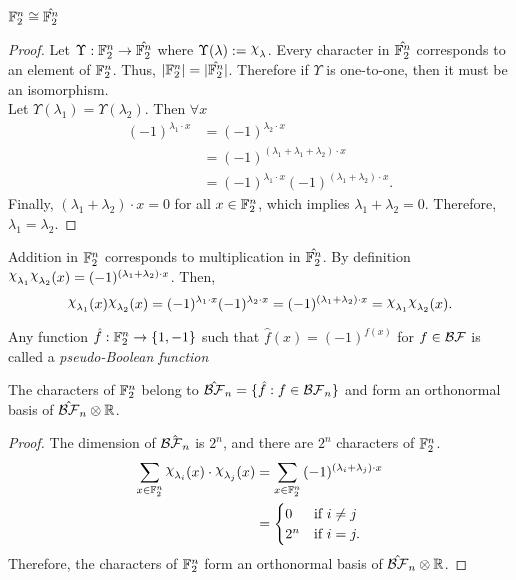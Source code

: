 \begin{lemma}
  $\mathbb{F}_2^n\cong\hat{\mathbb{F}_2^n}$
\end{lemma}

\begin{proof}
  \par Let $\Upsilon:\mathbb{F}_2^n\rightarrow\hat{\mathbb{F}_2^n}$ where
  $\Upsilon(\lambda):=\Chi_\lambda$.
	Every character in $\hat{\mathbb{F}_2^n}$ corresponds to an element of
  $\mathbb{F}_2^n$. Thus, $\lvert\mathbb{F}_2^n\rvert=\lvert\hat{\mathbb{F}_2^n}\rvert$.
  Therefore if $\Upsilon$ is one-to-one, then it must be an isomorphism.\\
	Let $\Upsilon(\lambda_1)=\Upsilon(\lambda_2)$. Then $\forall x$
	\begin{align*}
		(-1)^{\lambda_1\cdot x}
      &=(-1)^{\lambda_2\cdot x}\\
		  &=(-1)^{(\lambda_1+\lambda_1+\lambda_2)\cdot x}\\
      &=(-1)^{\lambda_1\cdot x}(-1)^{(\lambda_1+\lambda_2)\cdot x}.
	\end{align*}
	Finally, $(\lambda_1+\lambda_2)\cdot x=0$ for all $x\in\mathbb{F}_2^n$, which
  implies $\lambda_1+\lambda_2=0$. Therefore, $\lambda_1=\lambda_2$.
\end{proof}

\par Addition in $\mathbb{F}_2^n$ corresponds to multiplication in
$\hat{\mathbb{F}_2^n}$. By definition
$\Chi_{\lambda_1}\Chi_{\lambda_2}(x)=(-1)^{(\lambda_1+\lambda_2)\cdot x}$.
Then,
\[
\Chi_{\lambda_1}(x)\Chi_{\lambda_2}(x)
  =(-1)^{\lambda_1\cdot x}(-1)^{\lambda_2\cdot x}
  =(-1)^{(\lambda_1+\lambda_2)\cdot x}
  =\Chi_{\lambda_1}\Chi_{\lambda_2}(x).
\]

\begin{definition}\label{def:pBF}
	Any function $\hat{f}:\mathbb{F}_2^n\rightarrow\{1,-1\}$ such that
  $\hat{f}(x)=(-1)^{f(x)}$ for $f\in\mathcal{BF}$ is called a \textit{pseudo-Boolean
  function}
\end{definition}

\begin{lemma}
  The characters of $\mathbb{F}_2^n$ belong to $\hat{\mathcal{BF}}_n
  =\{\hat{f}:f\in\mathcal{BF}_n\}$ and form an orthonormal basis of
  $\hat{\mathcal{BF}}_n\otimes\mathbb{R}$.
\end{lemma}
\begin{proof}
  The dimension of $\hat{\mathcal{BF}_n}$ is $2^n$, and there are $2^n$ characters of
  $\mathbb{F}_2^n$.
  \begin{align*}
    \sum_{x\in\gftwo^n}{\Chi_{\lambda_i}(x)\cdot\Chi_{\lambda_j}(x)}
    &=\sum_{x\in\gftwo^n}
      {(-1)^{(\lambda_i+\lambda_j)\cdot x}}\\
    &=\begin{cases}
      0 & \text{if } i\not=j \\
      2^n & \text{if } i=j.
    \end{cases}
  \end{align*}
  Therefore, the characters of $\mathbb{F}_2^n$ form an orthonormal basis of
  $\hat{\mathcal{BF}}_n\otimes\mathbb{R}$.
\end{proof}

